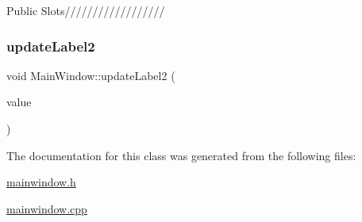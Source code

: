 Public Slots////////////////// \mbox{\label{class_main_window_a315247f5e13a056bb7b0eb9b7a1696a3}} 
\subsubsection{\texorpdfstring{update\+Label2}{updateLabel2}}
{\footnotesize\ttfamily void Main\+Window\+::update\+Label2 (\begin{DoxyParamCaption}\item[{Q\+String}]{value }\end{DoxyParamCaption})\hspace{0.3cm}{\ttfamily [slot]}}



The documentation for this class was generated from the following files\+:\begin{DoxyCompactItemize}
\item 
\mbox{\hyperlink{mainwindow_8h}{mainwindow.\+h}}\item 
\mbox{\hyperlink{mainwindow_8cpp}{mainwindow.\+cpp}}\end{DoxyCompactItemize}
